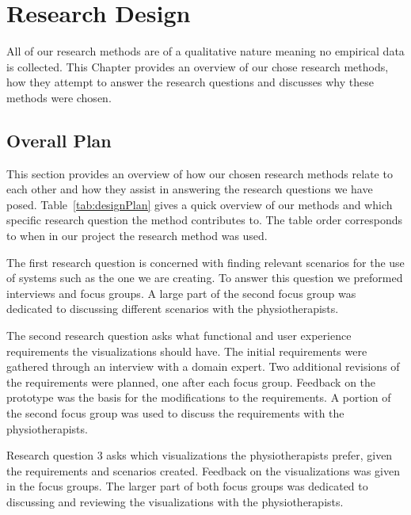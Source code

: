\chapter{Research Design}
\label{ch:researchDesign}
All of our research methods are of a qualitative nature meaning no empirical data is collected. This Chapter provides an overview of our chose research methods, how they attempt to answer the research questions and discusses why these methods were chosen.

\section{Overall Plan}
\label{sec:overview}
This section provides an overview of how our chosen research methods relate to each other and how they assist in answering the research questions we have posed. Table~\ref{tab:designPlan} gives a quick overview of our methods and which specific research question the method contributes to. The table order corresponds to when in our project the research method was used.

The first research question is concerned with finding relevant scenarios for the use of systems such as the one we are creating. To answer this question we preformed interviews and focus groups. A large part of the second focus group was dedicated to discussing different scenarios with the physiotherapists.

The second research question asks what functional and user experience requirements the visualizations should have. The initial requirements were gathered through an interview with a domain expert. Two additional revisions of the requirements were planned, one after each focus group. Feedback on the prototype was the basis for the modifications to the requirements. A portion of the second focus group was used to discuss the requirements with the physiotherapists.

Research question 3 asks which visualizations the physiotherapists prefer, given the requirements and scenarios created. Feedback on the visualizations was given in the focus groups. The larger part of both focus groups was dedicated to discussing and reviewing the visualizations with the physiotherapists. 

